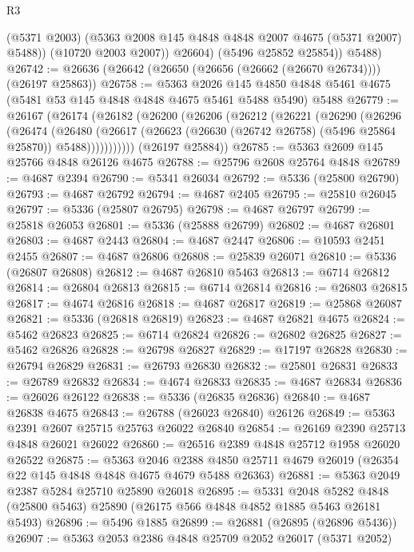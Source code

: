 \begin{lexlean}{R3}
\begin{coremodule}
              (@5371 @2003)
              (@5363 @2008 @145 @4848 @4848 @2007 @4675 (@5371 @2007) @5488))
            (@10720 @2003 @2007))
          @26604)
        (@5496 @25852 @25854))
      @5488)
@26742 := @26636 (@26642 (@26650 (@26656 (@26662 (@26670 @26734)))) (@26197 @25863))
@26758 := @5363
    @2026
    @145
    @4850
    @4848
    @5461
    @4675
    (@5481 @53 @145 @4848 @4848 @4675 @5461 @5488 @5490)
    @5488
@26779 := @26167
    (@26174
      (@26182
        (@26200
          (@26206
            (@26212
              (@26221
                (@26290
                  (@26296
                    (@26474
                      (@26480
                        (@26617
                          (@26623 (@26630 (@26742 @26758) (@5496 @25864 @25870)) @5488)))))))))))
      (@26197 @25884))
@26785 := @5363 @2609 @145 @25766 @4848 @26126 @4675
@26788 := @25796 @2608 @25764 @4848
@26789 := @4687 @2394
@26790 := @5341 @26034
@26792 := @5336 (@25800 @26790)
@26793 := @4687 @26792
@26794 := @4687 @2405
@26795 := @25810 @26045
@26797 := @5336 (@25807 @26795)
@26798 := @4687 @26797
@26799 := @25818 @26053
@26801 := @5336 (@25888 @26799)
@26802 := @4687 @26801
@26803 := @4687 @2443
@26804 := @4687 @2447
@26806 := @10593 @2451 @2455
@26807 := @4687 @26806
@26808 := @25839 @26071
@26810 := @5336 (@26807 @26808)
@26812 := @4687 @26810 @5463
@26813 := @6714 @26812
@26814 := @26804 @26813
@26815 := @6714 @26814
@26816 := @26803 @26815
@26817 := @4674 @26816
@26818 := @4687 @26817
@26819 := @25868 @26087
@26821 := @5336 (@26818 @26819)
@26823 := @4687 @26821 @4675
@26824 := @5462 @26823
@26825 := @6714 @26824
@26826 := @26802 @26825
@26827 := @5462 @26826
@26828 := @26798 @26827
@26829 := @17197 @26828
@26830 := @26794 @26829
@26831 := @26793 @26830
@26832 := @25801 @26831
@26833 := @26789 @26832
@26834 := @4674 @26833
@26835 := @4687 @26834
@26836 := @26026 @26122
@26838 := @5336 (@26835 @26836)
@26840 := @4687 @26838 @4675
@26843 := @26788 (@26023 @26840) @26126
@26849 := @5363 @2391 @2607 @25715 @25763 @26022 @26840
@26854 := @26169 @2390 @25713 @4848 @26021 @26022
@26860 := @26516 @2389 @4848 @25712 @1958 @26020 @26522
@26875 := @5363
    @2046
    @2388
    @4850
    @25711
    @4679
    @26019
    (@26354 @22 @145 @4848 @4848 @4675 @4679 @5488 @26363)
@26881 := @5363 @2049 @2387 @5284 @25710 @25890 @26018
@26895 := @5331
    @2048
    @5282
    @4848
    (@25800 @5463)
    @25890
    (@26175 @566 @4848 @4852 @1885 @5463 @26181 @5493)
@26896 := @5496 @1885
@26899 := @26881 (@26895 (@26896 @5436))
@26907 := @5363 @2053 @2386 @4848 @25709 @2052 @26017 (@5371 @2052)

\end{coremodule}
\end{lexlean}
